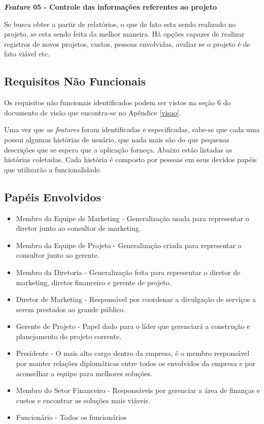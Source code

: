 \textbf{\textit{Feature} 05 - Controle das informações referentes ao projeto}

Se busca obter a partir de relatórios, o que de fato esta sendo realizado no projeto, se esta sendo feita da melhor maneira. Há opções capazes de realizar registros de novos projetos, custos, pessoas envolvidas, avaliar se o projeto é de fato viável etc.

\subsection{Requisitos Não Funcionais}
Os requisitos não funcionais identificados podem ser vistos na seção 6 do documento de visão que encontra-se no Apêndice \ref{visao}.

Uma vez que as \textit{features} foram identificadas e especificadas, sabe-se que cada uma possui algumas histórias de usuário, que nada mais são do que pequenas descrições que se espera que a aplicação forneça. Abaixo estão listadas as histórias coletadas. Cada história é composto por pessoas em seus devidos papéis que utilizarão a funcionalidade.

\subsection{Papéis Envolvidos}\begin{itemize}
\item Membro da Equipe de Marketing - Generalização usada para representar o diretor junto ao consultor de marketing.

\item Membro da Equipe de Projeto - Generalização criada para representar o consultor junto ao gerente.

\item Membro da Diretoria - Generalização feita para representar o diretor de marketing, diretor financeiro e gerente de projeto.

\item Diretor de Marketing - Responsável por coordenar a divulgação de serviços a serem prestados ao grande público.

\item Gerente de Projeto - Papel dado para o líder que gerenciará a construção e planejamento do projeto corrente.

\item Presidente - O mais alto cargo dentro da empresa, é o membro responsável por manter relações diplomáticas entre todos os envolvidos da empresa e por aconselhar a equipe para melhores soluções.

\item Membro do Setor Financeiro - Responsáveis por gerenciar a área de finanças e custos e encontrar as soluções mais viáveis. 

\item Funcionário - Todos os funcionários
\end{itemize}

